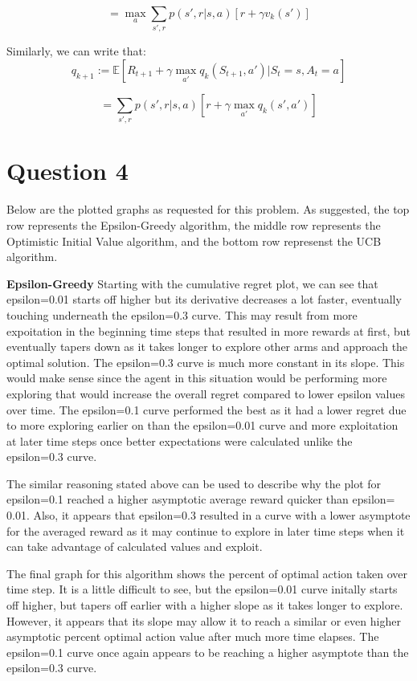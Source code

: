 \documentclass[11pt]{article}
\begin{document}
$$= \max_{a} \sum_{s\prime, r} p(s\prime, r | s,a)[r+\gamma v_{k}(s\prime)]$$

Similarly, we can write that:
$$
q_{k+1} := \mathbb{E}[R_{t+1} + \gamma \max_{a\prime}q_k(S_{t+1},a\prime) | S_{t} = s, A_{t} = a] 
$$

$$
= \sum_{s\prime, r} p(s\prime, r | s,a)[r+\gamma \max_{a\prime}q_{k}(s\prime, a\prime)]
$$

\section*{Question 4}
Below are the plotted graphs as requested for this problem. As suggested, the top row represents the Epsilon-Greedy algorithm, the middle row represents the Optimistic Initial Value algorithm, and the bottom row represenst the UCB algorithm.


\textbf{Epsilon-Greedy}
Starting with the cumulative regret plot, we can see that epsilon=0.01 starts off higher but its derivative decreases a lot faster, eventually touching underneath the epsilon=0.3 curve. This may result from more expoitation in the beginning time steps that resulted in more rewards at first, but eventually tapers down as it takes longer to explore other arms and approach the optimal solution. The epsilon=0.3 curve is much more constant in its slope. This would make sense since the agent in this situation would be performing more exploring that would increase the overall regret compared to lower epsilon values over time. The epsilon=0.1 curve performed the best as it had a lower regret due to more exploring earlier on than the epsilon=0.01 curve and more exploitation at later time steps once better expectations were calculated unlike the epsilon=0.3 curve.

The similar reasoning stated above can be used to describe why the plot for epsilon=0.1 reached a higher asymptotic average reward quicker than epsilon= 0.01. Also, it appears that epsilon=0.3 resulted in a curve with a lower asymptote for the averaged reward as it may continue to explore in later time steps when it can take advantage of calculated values and exploit.

The final graph for this algorithm shows the percent of optimal action taken over time step. It is a little difficult to see, but the epsilon=0.01 curve initally starts off higher, but tapers off earlier with a higher slope as it takes longer to explore. However, it appears that its slope may allow it to reach a similar or even higher asymptotic percent optimal action value after much more time elapses. The epsilon=0.1 curve once again appears to be reaching a higher asymptote than the epsilon=0.3 curve.
\end{document}
